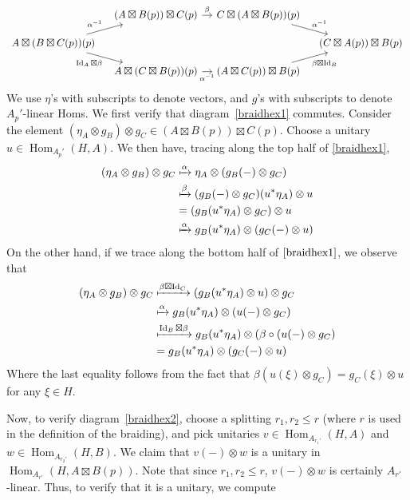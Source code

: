 \documentclass[11pt,reqno]{amsart}
\DeclareMathOperator{\Hom}{Hom}
\DeclareMathOperator{\Id}{Id}
\numberwithin{equation}{section}
\theoremstyle{plain}
\theoremstyle{definition}
\begin{document}
\begin{equation}\label{braidhex2}
    \begin{tikzcd}[column sep=1em, row sep=1em]
        & (A \boxtimes B(p)) \boxtimes C(p) \arrow[r, "\beta"] & C \boxtimes (A \boxtimes B(p))(p) \arrow[dr, "\alpha^{-1}"] & \\
        A \boxtimes (B \boxtimes C(p))(p) \arrow[ur, "\alpha^{-1}"] \arrow[dr, "\Id_A \boxtimes \beta"'] & & & (C \boxtimes A(p))\boxtimes B(p) \\
        & A \boxtimes (C \boxtimes B(p))(p) \arrow[r, "\alpha^{-1}"']& (A \boxtimes C(p)) \boxtimes B(p) \arrow[ur, "\beta \boxtimes \Id_B"'] &
    \end{tikzcd}
\end{equation}
We use $\eta$'s with subscripts to denote vectors, and $g$'s with subscripts to denote $A_p'$-linear Homs. 
We first verify that diagram~\ref{braidhex1} commutes. 
Consider the element $(\eta_A \otimes g_B) \otimes g_C \in (A \boxtimes B(p))\boxtimes C(p)$. Choose a unitary $u \in \Hom_{A_p'}(H, A)$. We then have, tracing along the top half of \ref{braidhex1}, 
\begin{align*}
(\eta_A \otimes g_B) \otimes g_C &\xmapsto{\alpha} \eta_A \otimes (g_B(-)\otimes g_C) \\
&\xmapsto{\beta}(g_B(-)\otimes g_C)(u^*\eta_A) \otimes u \\
&= (g_B(u^*\eta_A)\otimes g_C)\otimes u \\
&\xmapsto{\alpha} g_B(u^*\eta_A) \otimes (g_C(-)\otimes u)
\end{align*}
On the other hand, if we trace along the bottom half of $\ref{braidhex1}$, we observe that
\begin{align*}
(\eta_A \otimes g_B)\otimes g_C &\xmapsto{\beta \boxtimes \Id_C}(g_B(u^*\eta_A) \otimes u)\otimes g_C \\
&\xmapsto{\alpha}g_B(u^*\eta_A) \otimes (u(-) \otimes g_C) \\
&\xmapsto{\Id_B \boxtimes \beta} g_B(u^*\eta_A) \otimes (\beta \circ (u(-)\otimes g_C) \\
&=g_B(u^*\eta_A) \otimes (g_C(-)\otimes u)
\end{align*}
Where the last equality follows from the fact that $\beta(u(\xi) \otimes g_C) = g_C(\xi) \otimes u$ for any $\xi \in H$.
\par Now, to verify diagram~\ref{braidhex2}, choose a splitting $r_1,r_2 \leq r$ (where $r$ is used in the definition of the braiding), and pick unitaries $v \in \Hom_{A_{r_1'}}(H,A)$ and $w \in \Hom_{A_{r_2'}}(H,B)$. We claim that $v(-) \otimes w$ is a unitary in $\Hom_{A_{r'}}(H, A \boxtimes B(p))$. Note that since $r_1,r_2 \leq r$, $v(-) \otimes w$ is certainly $A_{r'}$ -linear. Thus, to verify that it is a unitary, we compute
\end{document}
